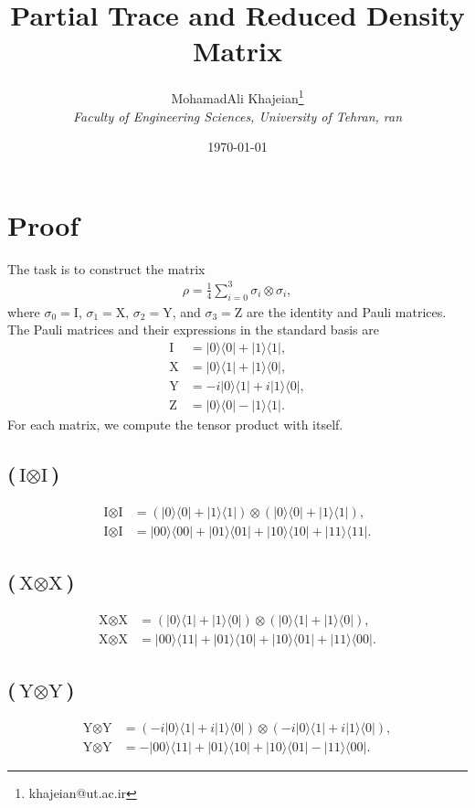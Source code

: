 \documentclass{article}
\title{\textbf{Partial Trace and Reduced Density Matrix}}
\author{
    MohamadAli Khajeian\footnote{khajeian@ut.ac.ir} \\ 
    \small \textit{Faculty of Engineering Sciences, University of Tehran, \text{I}ran} \\ 
}
\date{\today}
\newcommand{\op}[2]{|#1\rangle \langle#2|}
\begin{document}
\maketitle


\section*{Proof}

The task is to construct the matrix
\begin{align*}
\rho = \frac{1}{4} \sum_{i=0}^{3} \sigma_i \otimes \sigma_i,
\end{align*}
where $\sigma_0 = \text{I}$, $\sigma_1 = \text{X}$, $\sigma_2 = \text{Y}$, and $\sigma_3 = \text{Z}$ are the identity and Pauli matrices.
The Pauli matrices and their expressions in the standard basis are
\begin{align*}
\text{I} &= \op{0}{0} + \op{1}{1},\\
\text{X} &= \op{0}{1} + \op{1}{0},\\
\text{Y} &= -i\op{0}{1} + i\op{1}{0},\\
\text{Z} &= \op{0}{0} - \op{1}{1}.
\end{align*}
For each matrix, we compute the tensor product with itself.

\subsection*{($\text{I} \otimes \text{I}$)}
\begin{align*}
\text{I} \otimes \text{I} &= (\op{0}{0} + \op{1}{1}) \otimes (\op{0}{0} + \op{1}{1}), \\
\text{I} \otimes \text{I} &= \op{00}{00} + \op{01}{01} + \op{10}{10} + \op{11}{11}.
\end{align*}

\subsection*{($\text{X} \otimes \text{X}$)}
\begin{align*}
\text{X} \otimes \text{X} &= (\op{0}{1} + \op{1}{0}) \otimes (\op{0}{1} + \op{1}{0}), \\
\text{X} \otimes \text{X} &= \op{00}{11} + \op{01}{10} + \op{10}{01} + \op{11}{00}.
\end{align*}

\subsection*{($\text{Y} \otimes \text{Y}$)}
\begin{align*}
\text{Y} \otimes \text{Y} &= (-i\op{0}{1} + i\op{1}{0}) \otimes (-i\op{0}{1} + i\op{1}{0}), \\
\text{Y} \otimes \text{Y} &= -\op{00}{11} + \op{01}{10} + \op{10}{01} - \op{11}{00}.
\end{align*}
\end{document}
